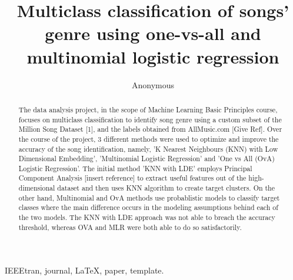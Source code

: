 \documentclass[journal]{IEEEtran}
\begin{document}
%
\title{Multiclass classification of songs' genre using one-vs-all and multinomial logistic regression}

\author{Anonymous}

\maketitle


\begin{abstract}
The data analysis project, in the scope of Machine Learning Basic Principles course, focuses on multiclass classification to identify song genre using a custom subset of the Million Song Dataset [1], and the labels obtained from AllMusic.com [Give Ref]. Over the course of the project, 3 different methods were used to optimize and improve the accuracy of the song identification, namely, 'K Nearest Neighbours (KNN) with Low Dimensional Embedding', 'Multinomial Logistic Regression' and 'One vs All (OvA) Logistic Regression'. The initial method 'KNN with LDE' employs Principal Component Analysis [insert reference] to extract useful features out of the high-dimensional dataset and then uses KNN algorithm to create target clusters. On the other hand, Multinomial and OvA methods use probablistic models to classify target classes where the main difference occurs in the modeling assumptions behind each of the two models. The KNN with LDE approach was not able to breach the accuracy threshold, whereas OVA and MLR were both able to do so satisfactorily.
\blindtext[1]
\end{abstract}

\begin{IEEEkeywords}
IEEEtran, journal, \LaTeX, paper, template.
\end{IEEEkeywords}






%
\IEEEpeerreviewmaketitle
\end{document}
